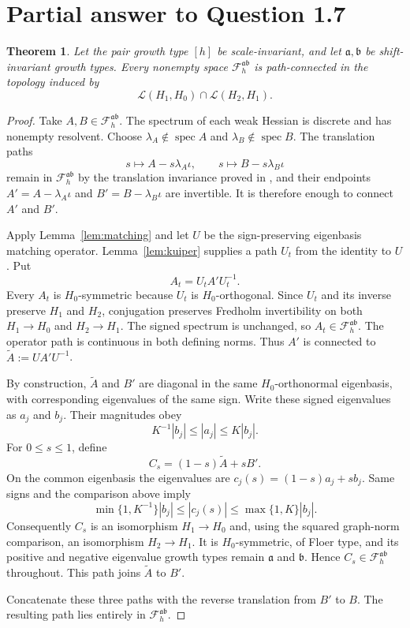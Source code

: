\documentclass[11pt]{article}
\newtheorem{theorem}{Theorem}
\newcommand{\F}{\mathcal F}
\newcommand{\spec}{\operatorname{spec}}
\begin{document}
\section{Partial answer to Question 1.7}

\begin{theorem}\label{thm:main}
Let the pair growth type $[h]$ be scale-invariant, and let
$\mathfrak a,\mathfrak b$ be shift-invariant growth types.  Every nonempty
space $\F_h^{\mathfrak a\mathfrak b}$ is path-connected in the topology
induced by
\[
 \mathcal L(H_1,H_0)\cap\mathcal L(H_2,H_1).
\]
\end{theorem}

\begin{proof}
Take $A,B\in\F_h^{\mathfrak a\mathfrak b}$.  The spectrum of each weak
Hessian is discrete and has nonempty resolvent.  Choose
$\lambda_A\notin\spec A$ and $\lambda_B\notin\spec B$.  The translation
paths
\[
 s\longmapsto A-s\lambda_A\iota,
 \qquad
 s\longmapsto B-s\lambda_B\iota
\]
remain in $\F_h^{\mathfrak a\mathfrak b}$ by the translation invariance
proved in \cite[Section 1.1]{FW}, and their endpoints
$A'=A-\lambda_A\iota$ and $B'=B-\lambda_B\iota$ are invertible.  It is
therefore enough to connect $A'$ and $B'$.

Apply Lemma~\ref{lem:matching} and let $U$ be the sign-preserving eigenbasis
matching operator.  Lemma~\ref{lem:kuiper} supplies a path $U_t$ from the
identity to $U$.  Put
\[
 A_t=U_tA'U_t^{-1}.
\]
Every $A_t$ is $H_0$-symmetric because $U_t$ is $H_0$-orthogonal.  Since
$U_t$ and its inverse preserve $H_1$ and $H_2$, conjugation preserves
Fredholm invertibility on both $H_1\to H_0$ and $H_2\to H_1$.  The signed
spectrum is unchanged, so $A_t\in\F_h^{\mathfrak a\mathfrak b}$.  The
operator path is continuous in both defining norms.  Thus $A'$ is connected
to $\widetilde A:=UA'U^{-1}$.

By construction, $\widetilde A$ and $B'$ are diagonal in the same
$H_0$-orthonormal eigenbasis, with corresponding eigenvalues of the same
sign.  Write these signed eigenvalues as $a_j$ and $b_j$.  Their magnitudes
obey
\[
 K^{-1}|b_j|\le |a_j|\le K|b_j|.
\]
For $0\le s\le1$, define
\[
 C_s=(1-s)\widetilde A+sB'.
\]
On the common eigenbasis the eigenvalues are
$c_j(s)=(1-s)a_j+sb_j$.  Same signs and the comparison above imply
\[
 \min\{1,K^{-1}\}|b_j|
 \le |c_j(s)|
 \le \max\{1,K\}|b_j|.
\]
Consequently $C_s$ is an isomorphism $H_1\to H_0$ and, using the squared
graph-norm comparison, an isomorphism $H_2\to H_1$.  It is
$H_0$-symmetric, of Floer type, and its positive and negative eigenvalue
growth types remain $\mathfrak a$ and $\mathfrak b$.  Hence
$C_s\in\F_h^{\mathfrak a\mathfrak b}$ throughout.  This path joins
$\widetilde A$ to $B'$.

Concatenate these three paths with the reverse translation from $B'$ to $B$.
The resulting path lies entirely in
$\F_h^{\mathfrak a\mathfrak b}$.
\end{proof}
\end{document}
